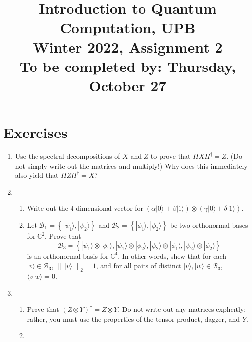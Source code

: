 \documentclass{article}
\newcommand{\ket}[1]{|#1\rangle}
\newcommand{\braket}[2]{\langle #1|#2\rangle}
\newcommand{\norm}[1]{\left\|\,#1\,\right\|}       %
\newcommand{\enorm}[1]{\norm{#1}_{\mathrm{2}}}      %
\newcommand{\set}[1]{{\left\{#1\right\}}}    %
\newcommand{\complex}{{\mathbb C}}
\begin{document}
\title{\vspace{-10mm}Introduction to Quantum Computation, UPB\\Winter 2022, Assignment 2\\{\large To be completed by: Thursday, October 27}}
\date{}
\maketitle

\section{Exercises}
\begin{enumerate}
    \item %
    Use the spectral decompositions of $X$ and $Z$ to prove that $HXH^\dagger=Z$. (Do not simply write out the matrices and multiply!) Why does this immediately also yield that $HZH^\dagger=X$?
    \item %
    \begin{enumerate}
        \item %
        Write out the 4-dimensional vector for $(\alpha\ket{0}+\beta\ket{1})\otimes(\gamma\ket{0}+\delta\ket{1})$.
        \item %
        Let $\mathcal{B}_1=\set{\ket{\psi_1},\ket{\psi_2}}$ and $\mathcal{B}_2=\set{\ket{\phi_1},\ket{\phi_2}}$ be two orthonormal bases for $\complex^2$. Prove that
            \[
            \mathcal{B}_3 = \set{\ket{\psi_1}\otimes\ket{\phi_1},\ket{\psi_1}\otimes\ket{\phi_2},\ket{\psi_2}\otimes\ket{\phi_1},\ket{\psi_2}\otimes\ket{\phi_2}}
            \]
            is an orthonormal basis for $\complex^4$. In other words, show that for each $\ket{v}\in\mathcal{B}_3$, $\enorm{\ket{v}}=1$, and for all pairs of distinct $\ket{v},\ket{w}\in\mathcal{B}_3$, $\braket{v}{w}=0$.
    \end{enumerate}
    \item %
            \begin{enumerate}
                \item %
                Prove that $(Z\otimes Y)^\dagger=Z\otimes Y$. Do not write out any matrices explicitly; rather, you must use the properties of the tensor product, dagger, and $Y$.
                \item %

\end{enumerate}
\end{enumerate}
\end{document}
